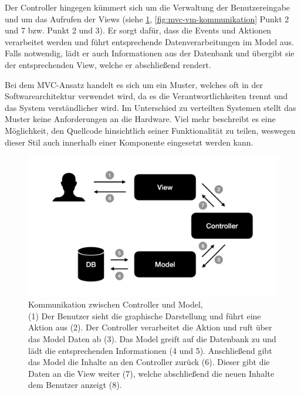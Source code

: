 Der Controller hingegen kümmert sich um die Verwaltung der Benutzereingabe und um das Aufrufen der Views (siehe \cref{fig:mvc-cm-kommunikation}, \cref{fig:mvc-vm-kommunikation} Punkt 2 und 7 bzw. Punkt 2 und 3). Er sorgt dafür, dass die Events und Aktionen verarbeitet werden und führt entsprechende Datenverarbeitungen im Model aus. Falls notwendig, lädt er auch Informationen aus der Datenbank und übergibt sie der entsprechenden View, welche er abschließend rendert.

Bei dem MVC-Ansatz handelt es sich um ein Muster, welches oft in der Softwarearchitektur verwendet wird, da es die Verantwortlichkeiten trennt und das System verständlicher wird.
Im Unterschied zu verteilten Systemen stellt das Muster keine Anforderungen an die Hardware. Viel mehr beschreibt es eine Möglichkeit, den Quellcode hinsichtlich seiner Funktionalität zu teilen, weswegen dieser Stil auch innerhalb einer Komponente eingesetzt werden kann.

\begin{figure}
	\centering
	\includegraphics[width=.6\textwidth]{Assets/Interaktionsorientiert.001}
	\caption[Kommunikation zwischen Controller und Model]{Kommunikation zwischen Controller und Model, \\ (1) Der Benutzer sieht die graphische Darstellung und führt eine Aktion aus (2). Der Controller verarbeitet die Aktion und ruft über das Model Daten ab (3). Das Model greift auf die Datenbank zu und lädt die entsprechenden Informationen (4 und 5). Anschließend gibt das Model die Inhalte an den Controller zurück (6). Dieser gibt die Daten an die View weiter (7), welche abschließend die neuen Inhalte dem Benutzer anzeigt (8).}
	\label{fig:mvc-cm-kommunikation}
 \end{figure}
 
